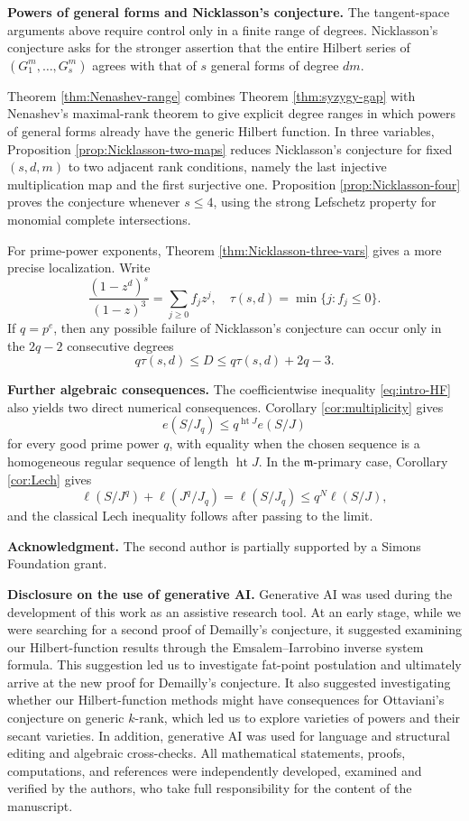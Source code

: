 \documentclass[11pt]{amsart}
\theoremstyle{remark}
\begin{document}
\medskip
\noindent\textbf{Powers of general forms and Nicklasson's conjecture.}
The tangent-space arguments above require control only in a finite range of degrees. Nicklasson's conjecture \cite{Nicklasson} asks for the stronger assertion that the entire Hilbert series of $(G_1^m,\ldots,G_s^m)$ agrees with that of $s$ general forms of degree $dm$.

Theorem \ref{thm:Nenashev-range} combines Theorem \ref{thm:syzygy-gap} with Nenashev's maximal-rank theorem to give explicit degree ranges in which powers of general forms already have the generic Hilbert function. In three variables, Proposition \ref{prop:Nicklasson-two-maps} reduces Nicklasson's conjecture for fixed $(s,d,m)$ to two adjacent rank conditions, namely the last injective multiplication map and the first surjective one. Proposition \ref{prop:Nicklasson-four} proves the conjecture whenever $s\le4$, using the strong Lefschetz property for monomial complete intersections.

For prime-power exponents, Theorem \ref{thm:Nicklasson-three-vars} gives a more precise localization. Write
$$
\frac{(1-z^d)^s}{(1-z)^3}=\sum_{j\ge0} f_jz^j,
\quad
\tau(s,d)=\min\{j:f_j\le0\}.
$$
If $q=p^e$, then any possible failure of Nicklasson's conjecture can occur only in the $2q-2$ consecutive degrees
$$
q\tau(s,d)\le D\le q\tau(s,d)+2q-3.
$$

\medskip
\noindent\textbf{Further algebraic consequences.}
The coefficientwise inequality \eqref{eq:intro-HF} also yields two direct numerical consequences. Corollary \ref{cor:multiplicity} gives
$$
e(S/J_q)\le q^{\operatorname{ht}J}e(S/J)
$$
for every good prime power $q$, with equality when the chosen sequence is a homogeneous regular sequence of length $\operatorname{ht}J$. In the $\mathfrak m$-primary case, Corollary \ref{cor:Lech} gives
$$
\ell(S/J^q)+\ell(J^q/J_q)=\ell(S/J_q)\le q^N\ell(S/J),
$$
and the classical Lech inequality follows after passing to the limit.

\medskip
\noindent\textbf{Acknowledgment.} The second author is partially supported by a Simons Foundation grant.

\medskip
\noindent\textbf{Disclosure on the use of generative AI.} Generative AI was used during the development of this work as an assistive research tool. At an early stage, while we were searching for a second proof of Demailly's conjecture, it suggested examining our Hilbert-function results through the Emsalem--Iarrobino inverse system formula. This suggestion led us to investigate fat-point postulation and ultimately arrive at the new proof for Demailly's conjecture. It also suggested investigating whether our Hilbert-function methods might have consequences for Ottaviani's conjecture on generic $k$-rank, which led us to explore varieties of powers and their secant varieties. In addition, generative AI was used for language and structural editing and algebraic cross-checks. All mathematical statements, proofs, computations, and references were independently developed, examined and verified by the authors, who take full responsibility for the content of the manuscript.
\end{document}
